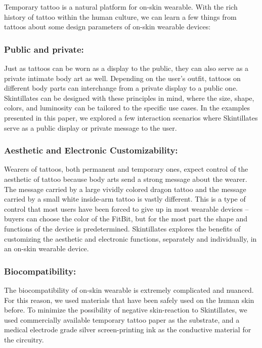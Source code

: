 \documentclass{sigchi}
\begin{document}
Temporary tattoo is a natural platform for on-skin wearable. With the rich history of tattoo within the human culture, we can learn a few things from tattoos about some design parameters of on-skin wearable devices: 

\subsubsection{Public and private:}
Just as tattoos can be worn as a display to the public, they can also serve as a private intimate body art as well. Depending on the user’s outfit, tattoos on different body parts can interchange from a private display to a public one. Skintillates can be designed with these principles in mind, where the size, shape, colors, and luminosity can be tailored to the specific use cases. In the examples presented in this paper, we explored a few interaction scenarios where Skintillates serve as a public display or private message to the user. 

\subsubsection{Aesthetic and Electronic Customizability:}
Wearers of tattoos, both permanent and temporary ones, expect control of the aesthetic of tattoo because body arts send a strong message about the wearer. The message carried by a large vividly colored dragon tattoo and the message carried by a small white inside-arm tattoo is vastly different. This is a type of control that most users have been forced to give up in most wearable devices – buyers can choose the color of the FitBit, but for the most part the shape and functions of the device is predetermined. Skintillates explores the benefits of customizing the aesthetic and electronic functions, separately and individually, in an on-skin wearable device. 

\subsubsection{Biocompatibility:}
The biocompatibility of on-skin wearable is extremely complicated and nuanced. For this reason, we used materials that have been safely used on the human skin before. To minimize the possibility of negative skin-reaction to Skintillates, we used commercially available temporary tattoo paper as the substrate, and a medical electrode grade silver screen-printing ink as the conductive material for the circuitry. 
\end{document}

